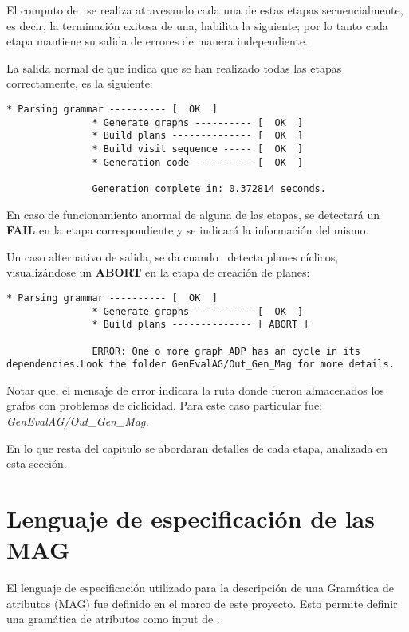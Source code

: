 El computo de \maggen\ se realiza atravesando cada una de estas etapas secuencialmente, es decir, la terminación exitosa de una, habilita la siguiente; por lo tanto cada etapa mantiene su salida de errores de manera independiente. 

La salida normal de \maggen que indica que se han realizado todas las etapas correctamente, es la siguiente:

\begin{lstlisting}[backgroundcolor=\color{white}]
               * Parsing grammar ---------- [  OK  ]
               * Generate graphs ---------- [  OK  ]
               * Build plans -------------- [  OK  ]
               * Build visit sequence ----- [  OK  ]
               * Generation code ---------- [  OK  ]

               Generation complete in: 0.372814 seconds.
\end{lstlisting}

En caso de funcionamiento anormal de alguna de las etapas, se detectará un \textbf{FAIL} en la etapa correspondiente y se indicará la información del mismo.

Un caso alternativo de salida, se da cuando \maggen\ detecta planes cíclicos, visualizándose un \textbf{ABORT} en la etapa de creación de planes:

\begin{lstlisting}[backgroundcolor=\color{white}] 
               * Parsing grammar ---------- [  OK  ]
               * Generate graphs ---------- [  OK  ]
               * Build plans -------------- [ ABORT ]

               ERROR: One o more graph ADP has an cycle in its dependencies.Look the folder GenEvalAG/Out_Gen_Mag for more details.
\end{lstlisting}
Notar que, el mensaje de error indicara la ruta donde fueron almacenados los grafos con problemas de ciclicidad. Para este caso particular fue: \textit{GenEvalAG/Out\_Gen\_Mag.}

En lo que resta del capitulo se abordaran detalles de cada etapa, analizada en esta sección.

\section{Lenguaje de especificación de las MAG}

El lenguaje de especificación utilizado para la descripción de una Gramática de atributos (MAG) fue definido en el marco de este proyecto. Esto permite definir una gramática de atributos como input de \maggen.
 

